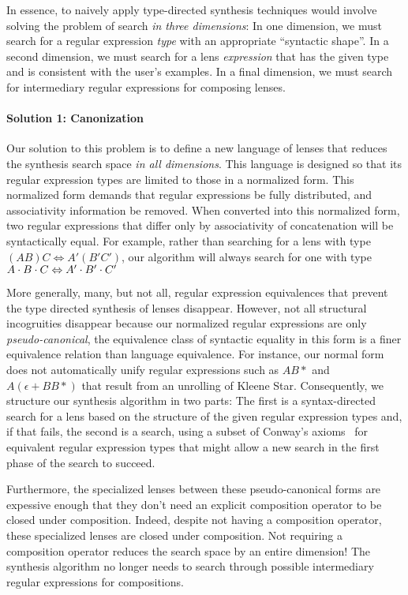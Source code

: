 \documentclass[numbers,10pt,preprint\ifanon ,nocopyrightspace\fi]{sigplanconf}
\begin{document}
In essence, to naively apply type-directed synthesis techniques would involve
solving the problem of search \emph{in three dimensions}:  In one
dimension, we must search for a regular expression \emph{type}
with an appropriate ``syntactic shape''.  In a second dimension,
we must search for a lens \emph{expression} that has the given type and
is consistent with the user's examples.  In a final dimension, we must search
for intermediary regular expressions for composing lenses.

\paragraph*{Solution 1: Canonization}
Our solution to this problem is to define a new language of lenses that
reduces the synthesis search space \emph{in all dimensions}.
This language is designed so that its regular expression types are limited 
to those in a normalized form.  This normalized form
demands that regular expressions be fully distributed, and associativity
information be removed.
When converted into this normalized form, two regular expressions that differ
only by associativity of concatenation will be syntactically equal.
For example, rather than searching for a lens with type 
$(A B) C \Leftrightarrow A' (B' C')$, our algorithm will always search
for one with type  $A \cdot B \cdot C \Leftrightarrow A' \cdot B'
\cdot C'$

More generally, many, but not all, regular expression equivalences that
prevent the type directed synthesis of lenses disappear.
However, not all structural incogruities disappear because our normalized
regular expressions
are only \emph{pseudo-canonical}, the equivalence class of syntactic equality in
this form is a finer equivalence relation than language equivalence.
For instance, our normal form
does not automatically unify regular expressions such as
$A B*$ and $A (\epsilon + BB*)$ that result from an
unrolling of Kleene Star.
Consequently, we structure our synthesis algorithm in two parts:  The
first is a syntax-directed search for a lens based on the structure of the given
regular expression types and, if that fails, the second is a search,
using a subset of Conway's axioms~\cite{conway} for 
equivalent regular expression types that might allow a new search
in the first phase of the search to succeed.

Furthermore, the specialized lenses between these
pseudo-canonical forms are expessive enough that they don't need an explicit
composition operator to be closed under composition.
Indeed, despite not having a composition operator, these specialized lenses 
are closed under composition.  Not requiring a composition operator reduces the
search space by an entire
dimension!  The synthesis algorithm no longer needs to search through possible
intermediary regular expressions for compositions.
\end{document}
